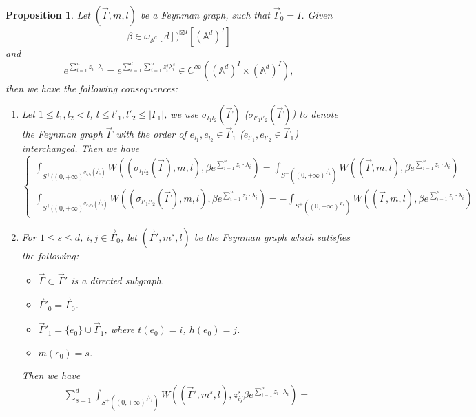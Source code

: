 \documentclass[11pt]{amsart}
\newtheorem{prop}[thm]{Proposition}
\theoremstyle{definition}
\theoremstyle{remark}
\numberwithin{equation}{section}
\begin{document}
\begin{prop}\label{well-defineness}
        Let $(\vec{\Gamma},m,l)$ be a Feynman graph, such that $\vec{\Gamma}_{0}= I$. Given 
    $$
    \beta\in \omega_{\mathbb{A}^{d}}[d])^{\boxtimes I}[(\mathbb{A}^{d})^{ I}]
    $$
    and
    $$
    e^{\sum_{i=1}^{n}z_{i}\cdot\lambda_{i}}=e^{\sum_{s=1}^{d}\sum_{i=1}^{n}z^{s}_{i}\lambda^{s}_{i}}\in C^{\infty}((\mathbb{A}^{d})^{ I}\times (\mathbb{A}^{d})^{ I}),
    $$
    then we have the following consequences:
    \begin{enumerate}
        \item Let $1\leq l_{1},l_{2}< l$, $l\leq l'_{1},l'_{2}\leq |\Gamma_{1}|$, we use $\sigma_{l_{1}l_{2}}(\vec{\Gamma})$ ($\sigma_{l'_{1}l'_{2}}(\vec{\Gamma})$) to denote the Feynman graph $\vec{\Gamma}$ with the order of $e_{l_{1}},e_{l_{2}}\in\vec{\Gamma}_{1}$ ($e_{l'_{1}},e_{l'_{2}}\in\vec{\Gamma}_{1}$) interchanged. Then we have
        $$
        \begin{cases}
            \int_{S^{+}((0,+\infty)^{\sigma_{l_{1}l_{2}}(\vec{\Gamma}_{1})}}W((\sigma_{l_{1}l_{2}}(\vec{\Gamma}),m,l),\beta e^{\sum_{i=1}^{n}z_{i}\cdot\lambda_{i}})=
        \int_{S^{+}((0,+\infty)^{\vec{\Gamma}_{1}})}W((\vec{\Gamma},m,l),\beta e^{\sum_{i=1}^{n}z_{i}\cdot\lambda_{i}})\\
        \int_{S^{+}((0,+\infty)^{\sigma_{l'_{1}l'_{2}}(\vec{\Gamma}_{1})}}W((\sigma_{l'_{1}l'_{2}}(\vec{\Gamma}),m,l),\beta e^{\sum_{i=1}^{n}z_{i}\cdot\lambda_{i}})=
        -\int_{S^{+}((0,+\infty)^{\vec{\Gamma}_{1}})}W((\vec{\Gamma},m,l),\beta e^{\sum_{i=1}^{n}z_{i}\cdot\lambda_{i}})
        \end{cases}
        $$
        \item For $1\leq s\leq d$, $i,j\in \vec{\Gamma}_{0}$, let $(\vec{\Gamma}',m^{s},l)$ be the Feynman graph which satisfies the following:
        \begin{itemize}
            \item $\vec{\Gamma}\subset\vec{\Gamma}'$ is a directed subgraph.
            \item $\vec{\Gamma}'_{0}=\vec{\Gamma}_{0}$.
            \item $\vec{\Gamma}'_{1}=\{e_{0}\}\cup\vec{\Gamma}_{1}$, where $t(e_{0})=i$, $h(e_{0})=j$.
            \item $m(e_{0})=s$.
        \end{itemize}
        Then we have
        \begin{align}\label{well-defined formula}
        \sum_{s=1}^{d}\int_{S^{+}((0,+\infty)^{\vec{\Gamma}'_{1}})}W((\vec{\Gamma}',m^{s},l),z_{ij}^{s}\beta e^{\sum_{i=1}^{n}z_{i}\cdot\lambda_{i}})=

\end{align}
\end{enumerate}
\end{prop}
\end{document}
